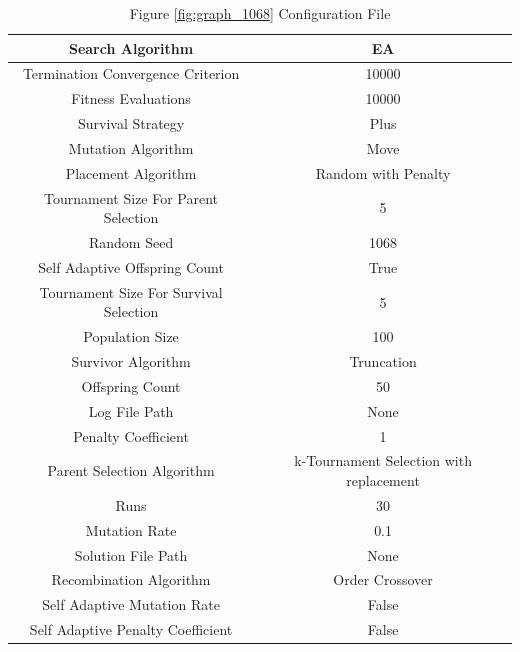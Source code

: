 \documentclass{standalone}
\begin{document}
\begin{table}[!htb]
	\centering
	\caption{Figure \ref{fig:graph_1068} Configuration File}
	\label{tab:graph_1068}
	\begin{tabular}{| c | c |}
		\hline
		Search Algorithm		& EA		 \\
		\hline
		Termination Convergence Criterion		& 10000		 \\
		\hline
		Fitness Evaluations		& 10000		 \\
		\hline
		Survival Strategy		& Plus		 \\
		\hline
		Mutation Algorithm		& Move		 \\
		\hline
		Placement Algorithm		& Random with Penalty		 \\
		\hline
		Tournament Size For Parent Selection		& 5		 \\
		\hline
		Random Seed		& 1068		 \\
		\hline
		Self Adaptive Offspring Count		& True		 \\
		\hline
		Tournament Size For Survival Selection		& 5		 \\
		\hline
		Population Size		& 100		 \\
		\hline
		Survivor Algorithm		& Truncation		 \\
		\hline
		Offspring Count		& 50		 \\
		\hline
		Log File Path		& None		 \\
		\hline
		Penalty Coefficient		& 1		 \\
		\hline
		Parent Selection Algorithm		& k-Tournament Selection with replacement		 \\
		\hline
		Runs		& 30		 \\
		\hline
		Mutation Rate		& 0.1		 \\
		\hline
		Solution File Path		& None		 \\
		\hline
		Recombination Algorithm		& Order Crossover		 \\
		\hline
		Self Adaptive Mutation Rate		& False		 \\
		\hline
		Self Adaptive Penalty Coefficient		& False		 \\
		\hline
	\end{tabular}
\end{table}
\end{document}
